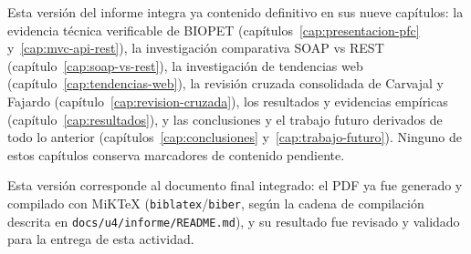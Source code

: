 Esta versi\'on del informe integra ya contenido definitivo en sus nueve
cap\'itulos: la evidencia t\'ecnica verificable de BIOPET
(cap\'itulos~\ref{cap:presentacion-pfc} y~\ref{cap:mvc-api-rest}), la
investigaci\'on comparativa SOAP vs REST
(cap\'itulo~\ref{cap:soap-vs-rest}), la investigaci\'on de tendencias web
(cap\'itulo~\ref{cap:tendencias-web}), la revisi\'on cruzada consolidada de
Carvajal y Fajardo (cap\'itulo~\ref{cap:revision-cruzada}), los resultados y
evidencias emp\'iricas (cap\'itulo~\ref{cap:resultados}), y las
conclusiones y el trabajo futuro derivados de todo lo anterior
(cap\'itulos~\ref{cap:conclusiones} y~\ref{cap:trabajo-futuro}). Ninguno de
estos cap\'itulos conserva marcadores de contenido pendiente.

Esta versi\'on corresponde al documento final integrado: el PDF ya fue
generado y compilado con MiKTeX (\texttt{biblatex}/\texttt{biber}, seg\'un
la cadena de compilaci\'on descrita en \texttt{docs/u4/informe/README.md}),
y su resultado fue revisado y validado para la entrega de esta actividad.
